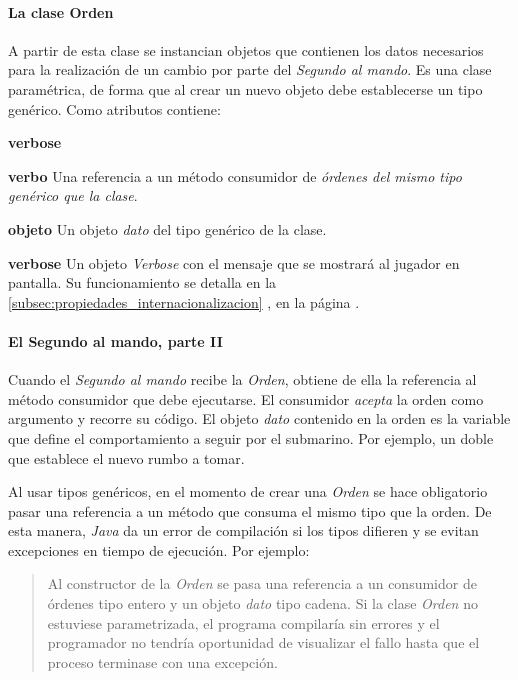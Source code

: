 \documentclass[a4paper,
	11pt,
	parskip=full,
	bibliography=totoc,
	twoside
	]{scrartcl}
\begin{document}
		\paragraph{La clase Orden}
			A partir de esta clase se instancian objetos que contienen los datos necesarios para la realización de un cambio por parte del \textit{Segundo al mando}. Es una clase paramétrica, de forma que al crear un nuevo objeto debe establecerse un tipo genérico. Como atributos contiene:
			\begin{labeling}{\textbf{verbose}}
				\item[\textbf{verbo}] Una referencia a un método consumidor de \textit{órdenes del mismo tipo genérico que la clase}.
				\item[\textbf{objeto}] Un objeto \textit{dato} del tipo genérico de la clase.
				\item[\textbf{verbose}] Un objeto \textit{Verbose} con el mensaje que se mostrará al jugador en pantalla. Su funcionamiento se detalla en la \autoref{subsec:propiedades_internacionalizacion} , en la página \pageref{subsec:propiedades_internacionalizacion}.
			\end{labeling}
		
			
		\paragraph{El Segundo al mando, parte II}
			Cuando el \textit{Segundo al mando} recibe la \textit{Orden}, obtiene de ella la referencia al método consumidor que debe ejecutarse. El consumidor \textit{acepta} la orden como argumento y recorre su código. El objeto \textit{dato} contenido en la orden es la variable que define el comportamiento a seguir por el submarino. Por ejemplo, un doble que establece el nuevo rumbo a tomar.
			
			Al usar tipos genéricos, en el momento de crear una \textit{Orden} se hace obligatorio pasar una referencia a un método que consuma el mismo tipo que la orden. De esta manera, \textit{Java} da un error de compilación si los tipos difieren y se evitan excepciones en tiempo de ejecución. Por ejemplo:
			\begin{quote}
				Al constructor de la \textit{Orden} se pasa una referencia a un consumidor de órdenes tipo entero y un objeto \textit{dato} tipo cadena. Si la clase \textit{Orden} no estuviese parametrizada, el programa compilaría sin errores y el programador no tendría oportunidad de visualizar el fallo hasta que el proceso terminase con una excepción.
			\end{quote}
			
\end{document}
